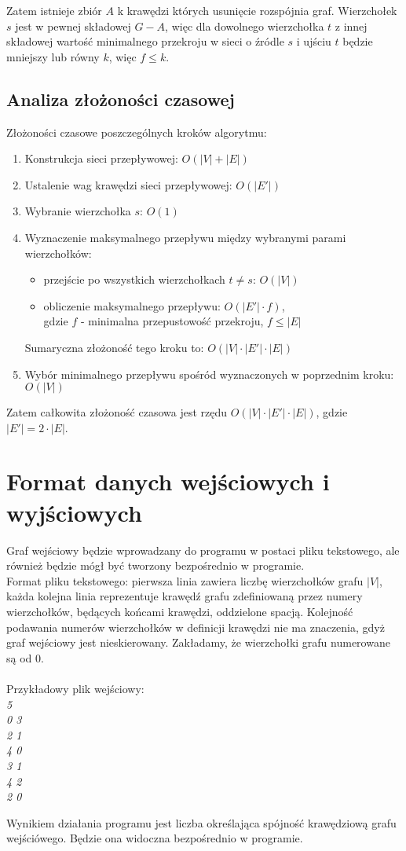 \documentclass{article}
\begin{document}
Zatem istnieje zbiór $A$ k krawędzi których usunięcie rozspójnia graf. Wierzchołek $s$ jest w pewnej składowej $G-A$, więc dla dowolnego wierzchołka $t$ z innej składowej wartość minimalnego przekroju w sieci o źródle $s$ i ujściu $t$ będzie mniejszy lub równy $k$, więc $f \le k$.


\subsection{Analiza złożoności czasowej}


Złożoności czasowe poszczególnych kroków algorytmu: 
\begin{enumerate}
\item Konstrukcja sieci przepływowej: $O(|V|+|E|)$
\item Ustalenie wag krawędzi sieci przepływowej: $O(|E'|)$
\item Wybranie wierzchołka $s$: $O(1)$
\item Wyznaczenie maksymalnego przepływu między wybranymi parami wierzchołków: 
\begin{itemize}
    \item przejście po wszystkich wierzchołkach $t \neq s$: $O(|V|)$
    \item obliczenie maksymalnego przepływu: $O(|E'|\cdot f)$, \\gdzie $f$ - minimalna przepustowość przekroju, $f \le |E|$ 
\end{itemize}
Sumaryczna złożoność tego kroku to: $O(|V|\cdot|E'|\cdot |E|)$
\item Wybór minimalnego przepływu spośród wyznaczonych w poprzednim kroku: $O(|V|)$
\end{enumerate}
Zatem całkowita złożoność czasowa jest rzędu $O(|V|\cdot|E'|\cdot |E|)$, gdzie $|E'|=2\cdot |E|$.\\


\section{Format danych wejściowych i wyjściowych}
Graf wejściowy będzie wprowadzany do programu w postaci pliku tekstowego, ale również będzie mógł być tworzony bezpośrednio w programie.\\

Format pliku tekstowego: pierwsza linia zawiera liczbę wierzchołków grafu $|V|$, każda kolejna linia reprezentuje krawędź grafu zdefiniowaną przez numery wierzchołków, będących końcami krawędzi, oddzielone spacją. Kolejność podawania numerów wierzchołków w definicji krawędzi nie ma znaczenia, gdyż graf wejściowy jest nieskierowany. Zakładamy, że wierzchołki grafu numerowane są od 0.
\\\\
Przykładowy plik wejściowy:\\
\textit{5\\
0 3\\
2 1\\
4 0\\
3 1\\
4 2\\
2 0\\
}


Wynikiem działania programu jest liczba określająca spójność krawędziową grafu wejściówego. Będzie ona widoczna bezpośrednio w programie.
\end{document}
